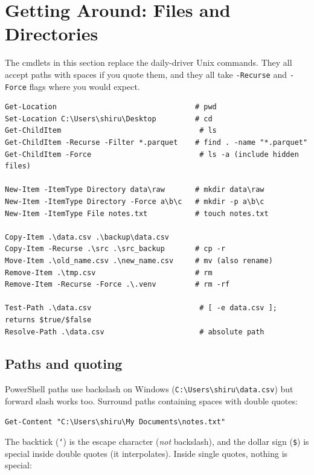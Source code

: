 \documentclass[11pt,a4paper]{article}
\begin{document}
\section{Getting Around: Files and Directories}

The cmdlets in this section replace the daily-driver Unix commands.
They all accept paths with spaces if you quote them, and they all
take \texttt{-Recurse} and \texttt{-Force} flags where you would
expect.

\begin{lstlisting}[style=pwshstyle]
Get-Location                                # pwd
Set-Location C:\Users\shiru\Desktop         # cd
Get-ChildItem                                # ls
Get-ChildItem -Recurse -Filter *.parquet    # find . -name "*.parquet"
Get-ChildItem -Force                         # ls -a (include hidden files)

New-Item -ItemType Directory data\raw       # mkdir data\raw
New-Item -ItemType Directory -Force a\b\c   # mkdir -p a\b\c
New-Item -ItemType File notes.txt           # touch notes.txt

Copy-Item .\data.csv .\backup\data.csv
Copy-Item -Recurse .\src .\src_backup       # cp -r
Move-Item .\old_name.csv .\new_name.csv     # mv (also rename)
Remove-Item .\tmp.csv                       # rm
Remove-Item -Recurse -Force .\.venv         # rm -rf

Test-Path .\data.csv                         # [ -e data.csv ]; returns $true/$false
Resolve-Path .\data.csv                      # absolute path
\end{lstlisting}

\subsection*{Paths and quoting}

PowerShell paths use backslash on Windows (\texttt{C:\textbackslash{}Users\textbackslash{}shiru\textbackslash{}data.csv})
but forward slash works too. Surround paths containing spaces with
double quotes:

\begin{lstlisting}[style=pwshstyle]
Get-Content "C:\Users\shiru\My Documents\notes.txt"
\end{lstlisting}

The backtick (\texttt{`}) is the escape character (\emph{not} backslash),
and the dollar sign (\texttt{\$}) is special inside double quotes (it
interpolates). Inside single quotes, nothing is special:
\end{document}

